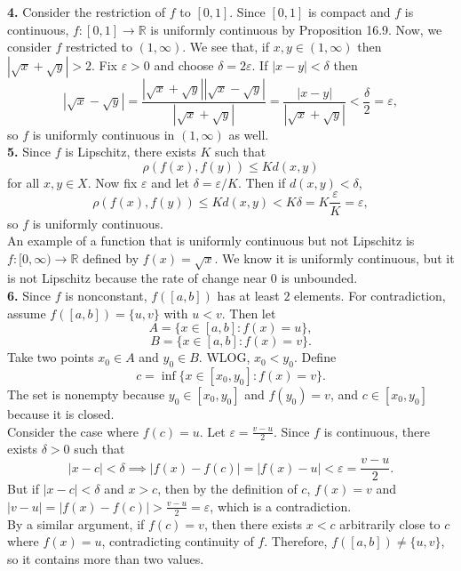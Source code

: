 \documentclass{article}
\newcommand{\R}{\mathbb{R}}
\newcommand{\eps}{\varepsilon}
\begin{document}
\textbf{4.} Consider the restriction of $f$ to $[0, 1]$. Since $[0, 1]$ is compact and $f$ is continuous, $f: [0, 1] \to \R$ is uniformly continuous by Proposition 16.9. Now, we consider $f$ restricted to $(1, \infty)$. We see that, if $x, y \in (1, \infty)$ then $|\sqrt{x} + \sqrt{y}| > 2$. Fix $\eps > 0$ and choose $\delta = 2\eps$. If $|x - y| < \delta$ then
$$|\sqrt{x} - \sqrt{y}| = \frac{|\sqrt{x} + \sqrt{y}||\sqrt{x} - \sqrt{y}|}{|\sqrt{x} + \sqrt{y}|} = \frac{|x - y|}{|\sqrt{x} + \sqrt{y}|} < \frac{\delta}{2} = \eps,$$
so $f$ is uniformly continuous in $(1, \infty)$ as well. \\

\textbf{5.} Since $f$ is Lipschitz, there exists $K$ such that
$$\rho(f(x), f(y)) \le Kd(x, y)$$
for all $x, y \in X$. Now fix $\eps$ and let $\delta = \eps/K$. Then if $d(x, y) < \delta$,
$$\rho(f(x), f(y)) \le Kd(x, y) < K\delta = K\frac{\eps}{K} = \eps,$$
so $f$ is uniformly continuous. \\

An example of a function that is uniformly continuous but not Lipschitz is $f: [0, \infty) \to \R$ defined by $f(x) = \sqrt{x}$. We know it is uniformly continuous, but it is not Lipschitz because the rate of change near $0$ is unbounded. \\

\textbf{6.} Since $f$ is nonconstant, $f([a, b])$ has at least $2$ elements. For contradiction, assume $f([a, b]) = \{u, v\}$ with $u < v$. Then let
$$A = \{x \in [a, b]: f(x) = u\},$$
$$B = \{x \in [a, b]: f(x) = v\}.$$
Take two points $x_0 \in A$ and $y_0 \in B$. WLOG, $x_0 < y_0$. Define
$$c = \inf\{x \in [x_0, y_0]: f(x) = v\}.$$
The set is nonempty because $y_0 \in [x_0, y_0]$ and $f(y_0) = v$, and $c \in [x_0, y_0]$ because it is closed. \\

Consider the case where $f(c) = u$. Let $\eps = \frac{v - u}{2}$. Since $f$ is continuous, there exists $\delta > 0$ such that
$$|x - c| < \delta \implies |f(x) - f(c)| = |f(x) - u| < \eps = \frac{v - u}{2}.$$
But if $|x - c| < \delta$ and $x > c$, then by the definition of $c$, $f(x) = v$ and $|v - u| = |f(x) - f(c)| > \frac{v - u}{2} = \eps$, which is a contradiction. \\

By a similar argument, if $f(c) = v$, then there exists $x < c$ arbitrarily close to $c$ where $f(x) = u$, contradicting continuity of $f$. Therefore, $f([a, b]) \neq \{u, v\}$, so it contains more than two values. \\
\end{document}
